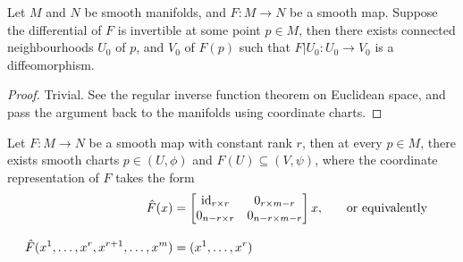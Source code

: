 \documentclass[../main-manifolds.tex]{subfiles}
\begin{document}
\begin{wts}\label{lee-chp4:inverse-theorem-on-manifolds}
    Let $M$ and $N$ be smooth manifolds, and $F:M\to N$ be a smooth map. Suppose the differential of $F$ is invertible at some point $p\in M$, then there exists connected neighbourhoods $U_0$ of $p$, and $V_0$ of $F(p)$ such that $F|U_0:U_0\to V_0$ is a diffeomorphism.
\end{wts}
\begin{proof}
    Trivial. See the regular inverse function theorem  on Euclidean space, and pass the argument back to the manifolds using coordinate charts.
\end{proof}
\begin{wts}\label{lee-chp4:rank-theorem-for-manifolds}
    Let $F:M\to N$ be a smooth map with constant rank $r$, then at every $p\in M$, there exists smooth charts $p\in (U,\phi)$ and $F(U)\subseteq(V,\psi)$, where the coordinate representation of $F$ takes the form
    \begin{align}\label{lee-chp4:rank-theorem-regular-case-coordinate-representation}
        \hat{F}(x) &= \begin{bmatrix}
            \id{r\times r} & 0_{r\times m-r}\\
            0_{n-r\times r} & 0_{n-r\times m-r}
        \end{bmatrix}x, && \qq{or equivalently}\\[2ex]
        \hat{F}(x^1,\ldots,x^r,x^{r+1},\ldots,x^m)&=(x^1,\ldots,x^r)
    \end{align}
\end{wts}
\end{document}
